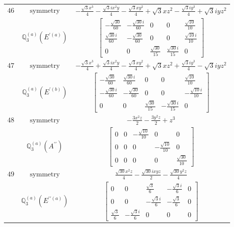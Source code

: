 \documentclass[fleqn,8pt,landscape]{jsarticle}
\begin{document}
\begin{longtable}{ccc}
$ 46 $ & $ \text{symmetry} $ & $ - \frac{\sqrt{3} x^{3}}{4} - \frac{\sqrt{3} i x^{2} y}{4} - \frac{\sqrt{3} x y^{2}}{4} + \sqrt{3} x z^{2} - \frac{\sqrt{3} i y^{3}}{4} + \sqrt{3} i y z^{2} $ \\
$  $ & $ \mathbb{Q}_{3}^{(a)}(E^{\prime(a)}) $ & $ \begin{bmatrix} - \frac{\sqrt{30}}{60} & - \frac{\sqrt{30} i}{60} & 0 & 0 & \frac{\sqrt{10}}{10} \\ \frac{\sqrt{30} i}{60} & - \frac{\sqrt{30}}{60} & 0 & 0 & \frac{\sqrt{10} i}{10} \\ 0 & 0 & \frac{\sqrt{30}}{15} & \frac{\sqrt{30} i}{15} & 0 \end{bmatrix} $ \\ \hline
$ 47 $ & $ \text{symmetry} $ & $ - \frac{\sqrt{3} x^{3}}{4} + \frac{\sqrt{3} i x^{2} y}{4} - \frac{\sqrt{3} x y^{2}}{4} + \sqrt{3} x z^{2} + \frac{\sqrt{3} i y^{3}}{4} - \sqrt{3} i y z^{2} $ \\
$  $ & $ \mathbb{Q}_{3}^{(a)}(E^{\prime(b)}) $ & $ \begin{bmatrix} - \frac{\sqrt{30}}{60} & \frac{\sqrt{30} i}{60} & 0 & 0 & \frac{\sqrt{10}}{10} \\ - \frac{\sqrt{30} i}{60} & - \frac{\sqrt{30}}{60} & 0 & 0 & - \frac{\sqrt{10} i}{10} \\ 0 & 0 & \frac{\sqrt{30}}{15} & - \frac{\sqrt{30} i}{15} & 0 \end{bmatrix} $ \\ \hline
$ 48 $ & $ \text{symmetry} $ & $ - \frac{3 x^{2} z}{2} - \frac{3 y^{2} z}{2} + z^{3} $ \\
$  $ & $ \mathbb{Q}_{3}^{(a)}(A^{\prime\prime}) $ & $ \begin{bmatrix} 0 & 0 & - \frac{\sqrt{10}}{10} & 0 & 0 \\ 0 & 0 & 0 & - \frac{\sqrt{10}}{10} & 0 \\ 0 & 0 & 0 & 0 & \frac{\sqrt{30}}{10} \end{bmatrix} $ \\ \hline
$ 49 $ & $ \text{symmetry} $ & $ \frac{\sqrt{30} x^{2} z}{4} - \frac{\sqrt{30} i x y z}{2} - \frac{\sqrt{30} y^{2} z}{4} $ \\
$  $ & $ \mathbb{Q}_{3}^{(a)}(E^{\prime\prime(a)}) $ & $ \begin{bmatrix} 0 & 0 & \frac{\sqrt{3}}{6} & - \frac{\sqrt{3} i}{6} & 0 \\ 0 & 0 & - \frac{\sqrt{3} i}{6} & - \frac{\sqrt{3}}{6} & 0 \\ \frac{\sqrt{3}}{6} & - \frac{\sqrt{3} i}{6} & 0 & 0 & 0 \end{bmatrix} $ \\ \hline

\end{longtable}
\end{document}
